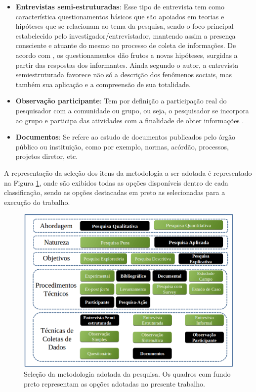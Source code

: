 \begin{itemize}
	\item \textbf{Entrevistas semi-estruturadas}: Esse tipo de entrevista tem  como  característica questionamentos básicos que são apoiados em teorias e hipóteses que se relacionam ao tema da pesquisa, sendo o foco principal estabelecido pelo investigador/entrevistador, mantendo assim a presença consciente e atuante do mesmo no processo de coleta de informações. De acordo com , os questionamentos dão frutos a novas hipóteses, surgidas a partir das respostas dos informantes. Ainda segundo o autor, a entrevista semiestruturada favorece não só a descrição dos fenômenos sociais, mas também sua aplicação e a compreensão de sua totalidade.
	\item \textbf{Observação participante}: Tem por definição a participação real do pesquisador com a comunidade ou grupo, ou seja, o pesquisador se incorpora ao grupo e participa das atividades com a finalidade de obter informações \cite{marconi2010fundamentos}.
	\item \textbf{Documentos}: Se refere ao estudo de documentos publicados pelo órgão público ou instituição, como por exemplo, normas, acórdão, processos, projetos diretor, etc.
\end{itemize}

A representação da seleção dos itens da metodologia a ser adotada é representado na Figura \ref{metodologia_adotada}, onde são exibidos todas as opções disponíveis dentro de cada classificação, sendo as opções destacadas em preto as selecionadas para a execução do trabalho.

\begin{figure}[!htb]
	\centering
	\includegraphics[scale=0.5]{figuras/Metodologia}
	\caption{Seleção da metodologia adotada da pesquisa. Os quadros com fundo preto representam as opções adotadas no presente trabalho.}
	\label{metodologia_adotada}
\end{figure}

